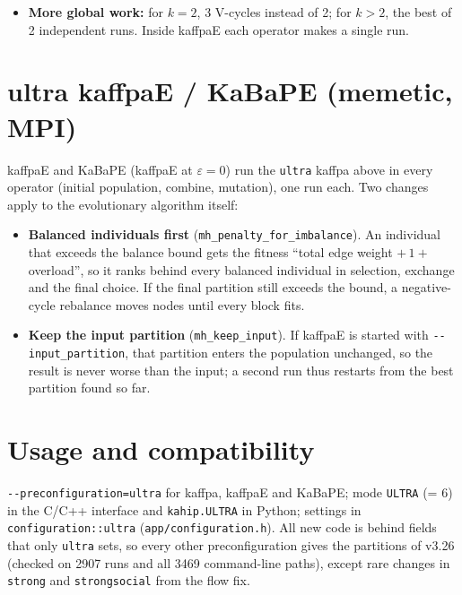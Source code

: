 \documentclass[10pt]{article}
\newcommand{\cfg}[1]{\texttt{#1}}
\begin{document}
\begin{itemize}
  these nodes can never change sides. In $F_H$, each region node $v$ gets a source edge with the weight of its edges
  to $A$ outside the region and a sink edge with the weight of its edges to $B$ outside the region; edges to third
  blocks are left out, since they are cut on either side. The value of an $s$-$t$ cut is then exactly the
  $A$--$B$ cut of the partition it induces, and the same region offers a larger space of cuts. Without any source or sink
  edge, the original model is used. As in \cfg{strong}, the most balanced minimum cut is taken. A long-standing
  flow bug (no flow network could be built, but the old cut was stored anyway) is fixed in v3.28 for all configurations.
  \item \textbf{More global work:} for $k=2$, 3 V-cycles instead of 2; for $k>2$, the best of 2 independent runs.
  Inside kaffpaE each operator makes a single run.
\end{itemize}

\section{ultra kaffpaE / KaBaPE (memetic, MPI)}
kaffpaE and KaBaPE (kaffpaE at $\varepsilon=0$) run the \cfg{ultra} kaffpa above in every operator (initial
population, combine, mutation), one run each. Two changes apply to the evolutionary algorithm itself:
\begin{itemize}
  \item \textbf{Balanced individuals first} (\cfg{mh\_penalty\_for\_imbalance}). An individual that exceeds the balance
  bound gets the fitness ``total edge weight $+\,1+$ overload'', so it ranks behind every balanced individual in
  selection, exchange and the final choice. If the final partition still exceeds the bound, a negative-cycle
  rebalance moves nodes until every block fits.
  \item \textbf{Keep the input partition} (\cfg{mh\_keep\_input}). If kaffpaE is started with
  \cfg{-{}-input\_partition}, that partition enters the population unchanged, so the result is never worse than the
  input; a second run thus restarts from the best partition found so far.
\end{itemize}

\section{Usage and compatibility}
\cfg{-{}-preconfiguration=ultra} for kaffpa, kaffpaE and KaBaPE; mode \cfg{ULTRA} (= 6) in the C/C++ interface and
\cfg{kahip.ULTRA} in Python; settings in \cfg{configuration::ultra} (\cfg{app/configuration.h}). All new code is
behind fields that only \cfg{ultra} sets, so every other preconfiguration gives the partitions of v3.26 (checked on
2907 runs and all 3469 command-line paths), except rare changes in \cfg{strong} and \cfg{strongsocial} from the flow fix.
\end{document}
